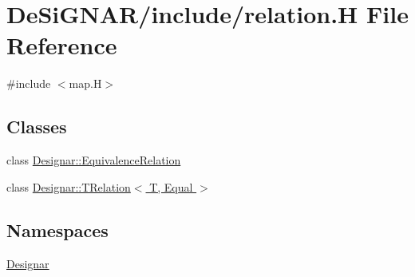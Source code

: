 \hypertarget{relation_8_h}{}\section{De\+Si\+G\+N\+A\+R/include/relation.H File Reference}
\label{relation_8_h}
{\ttfamily \#include $<$map.\+H$>$}\newline
\subsection*{Classes}
\begin{DoxyCompactItemize}
\item 
class \hyperlink{class_designar_1_1_equivalence_relation}{Designar\+::\+Equivalence\+Relation}
\item 
class \hyperlink{class_designar_1_1_t_relation}{Designar\+::\+T\+Relation$<$ T, Equal $>$}
\end{DoxyCompactItemize}
\subsection*{Namespaces}
\begin{DoxyCompactItemize}
\item 
 \hyperlink{namespace_designar}{Designar}
\end{DoxyCompactItemize}
